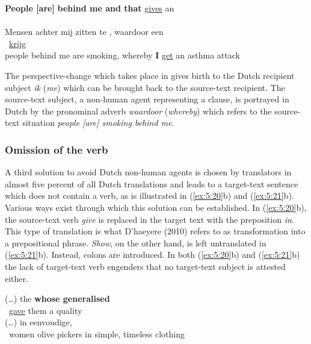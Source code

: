 \documentclass[output=paper]{LSP/langsci}
\begin{document}
\newpage
\ea \label{ex:5:19}
\ea
\textbf{People [are]}  \textbf{behind me and that} \ul{gives}  an\\\,  \\[1em]
\ex
Mensen achter mij zitten te , waardoor  een\\	\,  \ul{krijg}\\
people behind me are smoking, whereby \textbf{I} \ul{get} an asthma attack
\z
\z


The perspective-change which takes place in  gives birth to the Dutch recipient subject \textit{ik} (\textit{me}) which can be brought back to the source-text recipient. The source-text subject, a non-human agent representing a clause, is portrayed in Dutch by the pronominal adverb \textit{waardoor} (\textit{whereby}) which refers to the source-text situation \textit{people [are] smoking behind me}.
  

\subsubsection{Omission of the verb} \label{sec:5:6:2:3}

A third solution to avoid Dutch non-human agents is chosen by translators in almost five percent of all Dutch translations and leads to a target-text sentence which does not contain a verb, as is illustrated in (\ref{ex:5:20}b) and (\ref{ex:5:21}b). Various ways exist through which this solution can be established. In (\ref{ex:5:20}b), the source-text verb \textit{give} is replaced in the target text with the preposition \textit{in}. This type of translation is what D’haeyere (2010) refers to as transformation into a prepositional phrase. \textit{Show}, on the other hand, is left untranslated in (\ref{ex:5:21}b). Instead, colons are introduced. In both (\ref{ex:5:20}b) and (\ref{ex:5:21}b) the lack of target-text verb engenders that no target-text subject is attested either.     


\ea \label{ex:5:20} 
\ea
(\dots) the   \textbf{whose generalised} \\ \,   \ul{gave} them a  quality\\[1em]
\ex
(\dots)  in eenvoudige,  \\ \, 
women olive pickers in simple, timeless clothing
\z
\z
\end{document}
